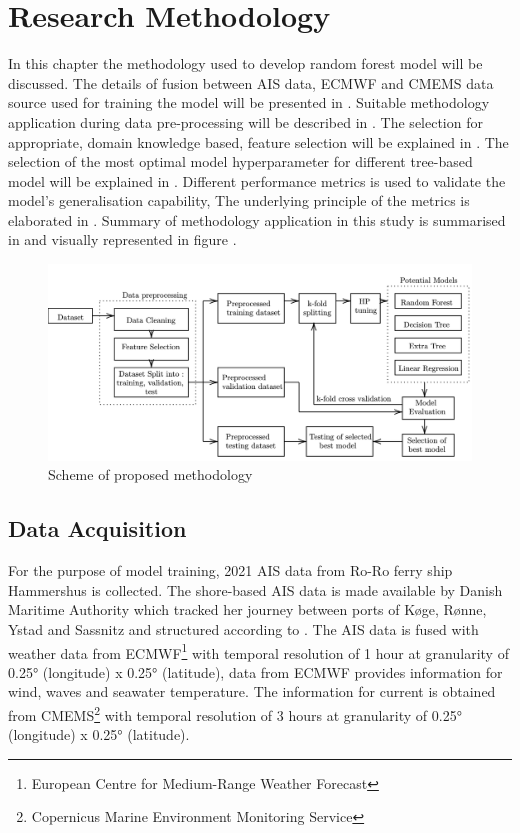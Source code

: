\section{Research Methodology} \label{method}

In this chapter the methodology used to develop random forest model will be discussed. The details of fusion between AIS data, ECMWF and CMEMS data source used for training the model will be presented in . Suitable methodology application during data pre-processing will be described in . The selection for appropriate, domain knowledge based, feature selection will be explained in . The selection of the most optimal model hyperparameter for different tree-based model will be explained in . Different performance metrics is used to validate the model's generalisation capability, The underlying principle of the metrics is elaborated in . Summary of methodology application in this study is summarised in  and visually represented in figure . 

\begin{figure}[h]
    \centering
        \includegraphics[width=\textwidth]{02_figures/flowmethod2.png}
        \caption{Scheme of proposed methodology}
        \label{fig:flowchart}
\end{figure}

\subsection{Data Acquisition}\label{data_acquisition}

For the purpose of model training, 2021 AIS data from Ro-Ro ferry ship Hammershus is collected. The shore-based AIS data is made available by Danish Maritime Authority which tracked her journey between ports of K{\o}ge, R{\o}nne, Ystad and Sassnitz and structured according to . The AIS data is fused with weather data from ECMWF\footnote{European Centre for Medium-Range Weather Forecast} with temporal resolution of 1 hour at granularity of 0.25° (longitude) x 0.25° (latitude), data from ECMWF provides information for wind, waves and seawater temperature. The information for current is obtained from CMEMS\footnote{Copernicus Marine Environment Monitoring Service} with temporal resolution of 3 hours at granularity of  0.25° (longitude) x 0.25° (latitude).\\ 

